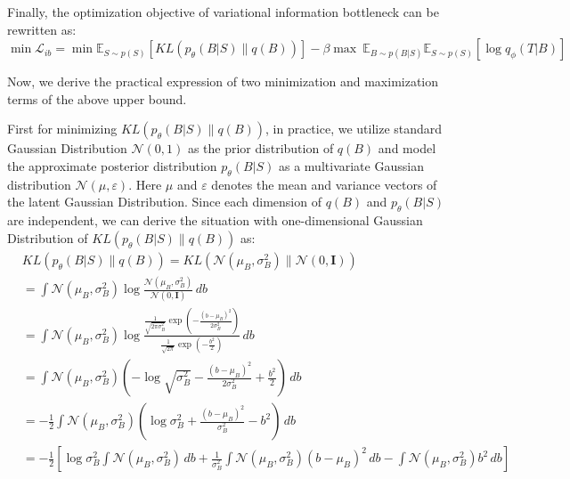 \documentclass{article}
\begin{document}
Finally, the optimization objective of variational information bottleneck can be rewritten as:
\begin{equation}
    \min\mathcal{L}_{ib} = \min\mathbb{E}_{S\sim p(S)} \left[KL( p_\theta(B|S)\parallel q(B))\right] - \beta\max\ \mathbb{E}_{B\sim p(B|S)}\mathbb{E}_{S\sim p(S)} [\log q_\phi(T|B)]
\end{equation}

Now, we derive the practical expression of two minimization and maximization terms of the above upper bound. 

First for minimizing $KL( p_\theta(B|S)\parallel q(B))$, in practice, we utilize standard Gaussian Distribution $\mathcal{N}(0,1)$ as the prior distribution of $q(B)$ and model the approximate posterior distribution $p_\theta(B|S)$ as a multivariate Gaussian distribution $\mathcal{N}(\mu, \varepsilon)$. Here $\mu$ and $\varepsilon$ denotes the mean and variance vectors of the latent Gaussian Distribution. Since each dimension of $q(B)$ and $p_\theta(B|S)$ are independent, we can derive the situation with one-dimensional Gaussian Distribution of $KL( p_\theta(B|S)\parallel q(B))$ as:
\begin{equation}
\begin{aligned}
    &KL( p_\theta(B|S)\parallel q(B)) = KL( \mathcal{N}(\mu_B, \sigma^2_B)\parallel\mathcal{N}(0,\textbf{I})) \\
    &= \int \mathcal{N}(\mu_B, \sigma^2_B) \log \frac{\mathcal{N}(\mu_B, \sigma^2_B)}{\mathcal{N}(0, \textbf{I})} \, db \\
    &= \int \mathcal{N}(\mu_B, \sigma^2_B) \log \frac{\frac{1}{\sqrt{2\pi \sigma^2_B}} \exp\left( -\frac{(b - \mu_B)^2}{2\sigma^2_B} \right)}{\frac{1}{\sqrt{2\pi}} \exp\left( -\frac{b^2}{2} \right)} \, db \\
    &= \int \mathcal{N}(\mu_B, \sigma^2_B) \left( -\log \sqrt{\sigma^2_B} - \frac{(b - \mu_B)^2}{2\sigma^2_B} + \frac{b^2}{2} \right) \, db \\
    &= -\frac{1}{2} \int \mathcal{N}(\mu_B, \sigma^2_B) \left(\log \sigma^2_B + \frac{(b - \mu_B)^2}{\sigma^2_B} - b^2 \right) \, db \\
    &= -\frac{1}{2} \left[ \log \sigma^2_B \int \mathcal{N}(\mu_B, \sigma^2_B) \, db + \frac{1}{\sigma^2_B} \int \mathcal{N}(\mu_B, \sigma^2_B)(b - \mu_B)^2 \, db - \int \mathcal{N}(\mu_B, \sigma^2_B) b^2 \, db \right]
\end{aligned}
\end{equation}
\end{document}
